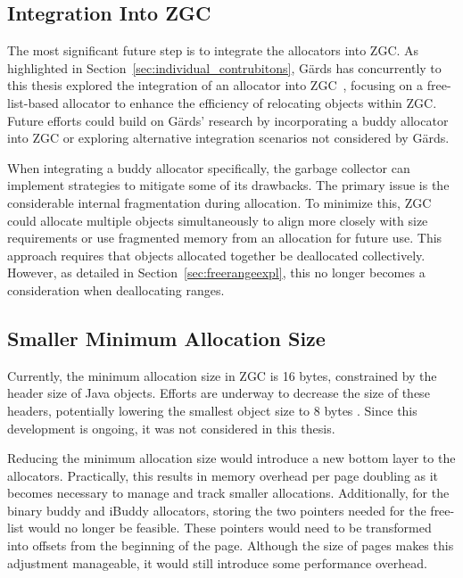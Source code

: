 \subsection{Integration Into ZGC} \label{sec:futureworkZ}

The most significant future step is to integrate the allocators into ZGC. As highlighted in Section~\ref{sec:individual_contrubitons}, Gärds has concurrently to this thesis explored the integration of an allocator into ZGC~\cite{niclas}, focusing on a free-list-based allocator to enhance the efficiency of relocating objects within ZGC. Future efforts could build on Gärds' research by incorporating a buddy allocator into ZGC or exploring alternative integration scenarios not considered by Gärds.

When integrating a buddy allocator specifically, the garbage collector can implement strategies to mitigate some of its drawbacks. The primary issue is the considerable internal fragmentation during allocation. To minimize this, ZGC could allocate multiple objects simultaneously to align more closely with size requirements or use fragmented memory from an allocation for future use. This approach requires that objects allocated together be deallocated collectively. However, as detailed in Section~\ref{sec:freerangeexpl}, this no longer becomes a consideration when deallocating ranges.

\subsection{Smaller Minimum Allocation Size} \label{sec:futureworkLiliput}
Currently, the minimum allocation size in ZGC is 16 bytes, constrained by the header size of Java objects. Efforts are underway to decrease the size of these headers, potentially lowering the smallest object size to 8 bytes \cite{liliput}. Since this development is ongoing, it was not considered in this thesis.

Reducing the minimum allocation size would introduce a new bottom layer to the allocators. Practically, this results in memory overhead per page doubling as it becomes necessary to manage and track smaller allocations. Additionally, for the binary buddy and iBuddy allocators, storing the two pointers needed for the free-list would no longer be feasible. These pointers would need to be transformed into offsets from the beginning of the page. Although the size of pages makes this adjustment manageable, it would still introduce some performance overhead.


